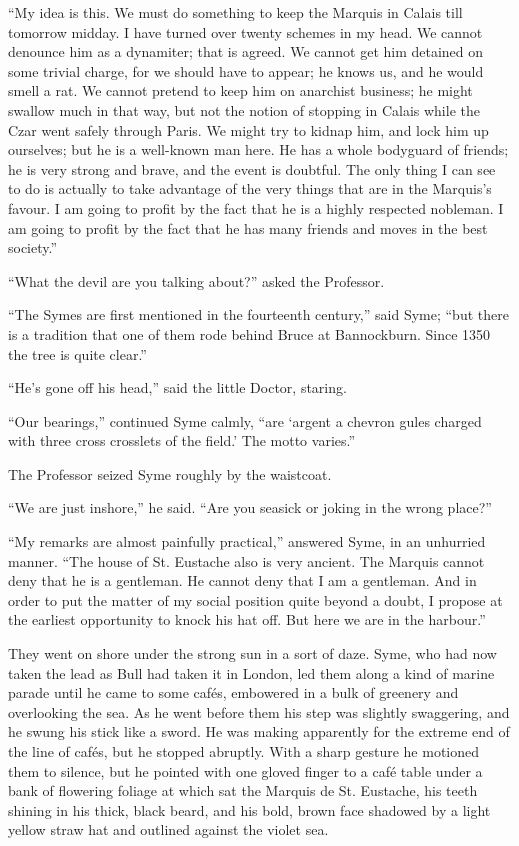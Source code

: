 “My idea is this. We must do something to keep the Marquis in Calais till tomorrow midday. I have turned over twenty schemes in my head. We cannot denounce him as a dynamiter; that is agreed. We cannot get him detained on some trivial charge, for we should have to appear; he knows us, and he would smell a rat. We cannot pretend to keep him on anarchist business; he might swallow much in that way, but not the notion of stopping in Calais while the Czar went safely through Paris. We might try to kidnap him, and lock him up ourselves; but he is a well-known man here. He has a whole bodyguard of friends; he is very strong and brave, and the event is doubtful. The only thing I can see to do is actually to take advantage of the very things that are in the Marquis’s favour. I am going to profit by the fact that he is a highly respected nobleman. I am going to profit by the fact that he has many friends and moves in the best society.”

“What the devil are you talking about?” asked the Professor.

“The Symes are first mentioned in the fourteenth century,” said Syme; “but there is a tradition that one of them rode behind Bruce at Bannockburn. Since 1350 the tree is quite clear.”

“He’s gone off his head,” said the little Doctor, staring.

“Our bearings,” continued Syme calmly, “are ‘argent a chevron gules charged with three cross crosslets of the field.’ The motto varies.”

The Professor seized Syme roughly by the waistcoat.

“We are just inshore,” he said. “Are you seasick or joking in the wrong place?”

“My remarks are almost painfully practical,” answered Syme, in an unhurried manner. “The house of St. Eustache also is very ancient. The Marquis cannot deny that he is a gentleman. He cannot deny that I am a gentleman. And in order to put the matter of my social position quite beyond a doubt, I propose at the earliest opportunity to knock his hat off. But here we are in the harbour.”

They went on shore under the strong sun in a sort of daze. Syme, who had now taken the lead as Bull had taken it in London, led them along a kind of marine parade until he came to some cafés, embowered in a bulk of greenery and overlooking the sea. As he went before them his step was slightly swaggering, and he swung his stick like a sword. He was making apparently for the extreme end of the line of cafés, but he stopped abruptly. With a sharp gesture he motioned them to silence, but he pointed with one gloved finger to a café table under a bank of flowering foliage at which sat the Marquis de St. Eustache, his teeth shining in his thick, black beard, and his bold, brown face shadowed by a light yellow straw hat and outlined against the violet sea.

